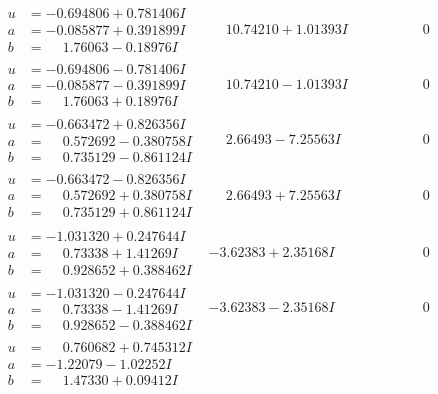 \documentclass[1p]{elsarticle_modified}
\theoremstyle{definition}
\begin{document}
$$\begin{array}{c|c|c}
\begin{aligned}
u &= -0.694806 + 0.781406 I \\
a &= -0.085877 + 0.391899 I \\
b &= \phantom{-}1.76063 - 0.18976 I\end{aligned}
 & \phantom{-}10.74210 + 1.01393 I & \phantom{-0.000000 } 0 \\ \hline\begin{aligned}
u &= -0.694806 - 0.781406 I \\
a &= -0.085877 - 0.391899 I \\
b &= \phantom{-}1.76063 + 0.18976 I\end{aligned}
 & \phantom{-}10.74210 - 1.01393 I & \phantom{-0.000000 } 0 \\ \hline\begin{aligned}
u &= -0.663472 + 0.826356 I \\
a &= \phantom{-}0.572692 - 0.380758 I \\
b &= \phantom{-}0.735129 - 0.861124 I\end{aligned}
 & \phantom{-}2.66493 - 7.25563 I & \phantom{-0.000000 } 0 \\ \hline\begin{aligned}
u &= -0.663472 - 0.826356 I \\
a &= \phantom{-}0.572692 + 0.380758 I \\
b &= \phantom{-}0.735129 + 0.861124 I\end{aligned}
 & \phantom{-}2.66493 + 7.25563 I & \phantom{-0.000000 } 0 \\ \hline\begin{aligned}
u &= -1.031320 + 0.247644 I \\
a &= \phantom{-}0.73338 + 1.41269 I \\
b &= \phantom{-}0.928652 + 0.388462 I\end{aligned}
 & -3.62383 + 2.35168 I & \phantom{-0.000000 } 0 \\ \hline\begin{aligned}
u &= -1.031320 - 0.247644 I \\
a &= \phantom{-}0.73338 - 1.41269 I \\
b &= \phantom{-}0.928652 - 0.388462 I\end{aligned}
 & -3.62383 - 2.35168 I & \phantom{-0.000000 } 0 \\ \hline\begin{aligned}
u &= \phantom{-}0.760682 + 0.745312 I \\
a &= -1.22079 - 1.02252 I \\
b &= \phantom{-}1.47330 + 0.09412 I\end{aligned}

\end{array}$$
\end{document}

